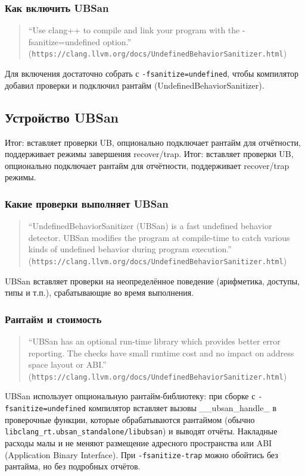 \documentclass[a4paper,12pt]{article}
\begin{document}
\subsubsection{Как включить UBSan}
\begin{quote}
``Use clang++ to compile and link your program with the -fsanitize=undefined option.'' (\texttt{https://clang.llvm.org/docs/UndefinedBehaviorSanitizer.html})
\end{quote}
Для включения достаточно собрать с \texttt{-fsanitize=undefined}, чтобы компилятор добавил проверки и подключил рантайм (UndefinedBehaviorSanitizer).

\subsection{Устройство UBSan}
Итог: вставляет проверки UB, опционально подключает рантайм для отчётности, поддерживает режимы завершения recover/trap.
Итог: вставляет проверки UB, опционально подключает рантайм для отчётности, поддерживает recover/trap режимы.
\subsubsection{Какие проверки выполняет UBSan}
\begin{quote}
``UndefinedBehaviorSanitizer (UBSan) is a fast undefined behavior detector. UBSan modifies the program at compile-time to catch various kinds of undefined behavior during program execution.'' (\texttt{https://clang.llvm.org/docs/UndefinedBehaviorSanitizer.html})
\end{quote}
UBSan вставляет проверки на неопределённое поведение (арифметика, доступы, типы и т.п.), срабатывающие во время выполнения.

\subsubsection{Рантайм и стоимость}
\begin{quote}
``UBSan has an optional run-time library which provides better error reporting. The checks have small runtime cost and no impact on address space layout or ABI.'' (\texttt{https://clang.llvm.org/docs/UndefinedBehaviorSanitizer.html})
\end{quote}
UBSan использует опциональную рантайм-библиотеку: при сборке с \texttt{-fsanitize=undefined} компилятор вставляет вызовы \_\_ubsan\_handle\_\* в проверочные функции, которые обрабатываются рантаймом (обычно \texttt{libclang\_rt.ubsan\_standalone/libubsan}) и выводят отчёты. Накладные расходы малы и не меняют размещение адресного пространства или ABI (Application Binary Interface). При \texttt{-fsanitize-trap} можно обойтись без рантайма, но без подробных отчётов.
\end{document}
